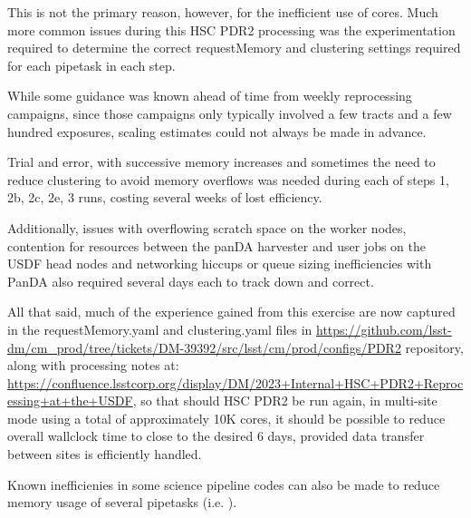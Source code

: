 This is not the primary reason, however, for the inefficient use of cores.
Much more common issues during this HSC PDR2 processing was the 
experimentation required to  determine the correct requestMemory and clustering
settings required for each pipetask in each step.

While some guidance was known ahead of time from weekly reprocessing
campaigns, since those campaigns only typically involved a few tracts and
a few hundred exposures, scaling estimates could not always be made
in advance.

Trial and error, with successive memory increases and sometimes the need to
reduce clustering to avoid memory overflows was needed during each of
steps 1, 2b, 2c, 2e, 3 runs, costing several weeks of lost efficiency.

Additionally, issues with overflowing scratch space on the worker nodes,
contention for resources between the panDA harvester and user jobs on the 
USDF head nodes and networking hiccups or queue sizing inefficiencies 
with PanDA also required several days each to track down and correct.

All that said, much of the experience gained from this exercise are
now captured in the requestMemory.yaml and clustering.yaml files
in \url{https://github.com/lsst-dm/cm_prod/tree/tickets/DM-39392/src/lsst/cm/prod/configs/PDR2} repository, along with processing notes at:
\url{https://confluence.lsstcorp.org/display/DM/2023+Internal+HSC+PDR2+Reprocessing+at+the+USDF}, so that should HSC PDR2 be run again, in multi-site 
mode using a total of approximately 10K cores, it should be 
possible to reduce overall wallclock time to close to the desired 6 days,
provided data transfer between sites is efficiently handled.

Known inefficienies in some science pipeline codes can also be made to
reduce memory usage of several pipetasks (i.e. ).
